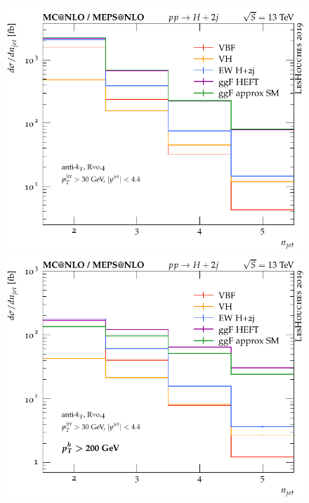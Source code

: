 \documentclass[10pt,prd,fleqn,superscriptaddress,notitlepage,nofootinbib,preprintnumbers,nobalancelastpage]{revtex4-1}
\begin{document}
\begin{figure}[p]
  \centering
  \begin{minipage}{.45\textwidth}
    \includegraphics[width=\textwidth]{figures/channels/njets.pdf}
    \includegraphics[width=\textwidth]{figures/channels/njets_pth200.pdf}

\end{minipage}
\end{figure}
\end{document}
